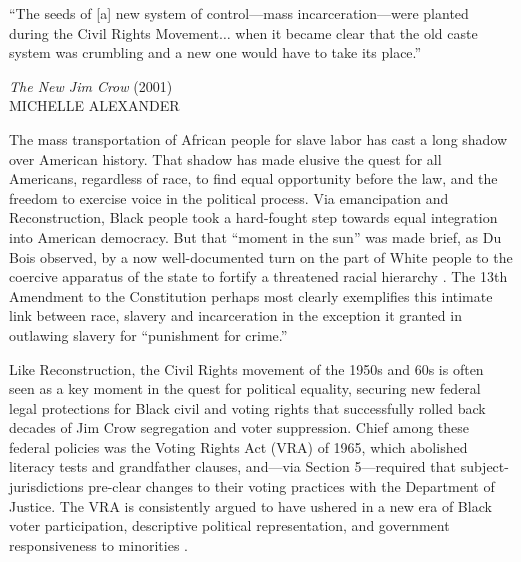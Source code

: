 \documentclass[12pt]{article}
\begin{document}
\newpage \clearpage





\singlespacing
\vspace{.2in}
\epigraph{``The seeds of [a] new system of control---mass incarceration---were planted during the Civil Rights Movement$\ldots$ when it became clear that the old caste system was crumbling and a new one would have to take its place.''}	{\footnotesize \textit{The New Jim Crow}  (2001)\\ \scriptsize MICHELLE ALEXANDER}

\vspace{.2in}

\onehalfspacing






The mass transportation of African people for slave labor has cast a long shadow over American history.  That shadow has made elusive the quest for all Americans, regardless of race, to find equal opportunity before the law, and the freedom to exercise voice in the political process.  Via emancipation and Reconstruction, Black people took a hard-fought step towards equal integration into American democracy.  But that ``moment in the sun'' was made brief, as Du Bois observed, by a now well-documented turn on the part of White people to the coercive apparatus of the state to fortify a threatened racial hierarchy  \citep{DuBois:1998vn,Lichtenstein:1996ug,Oshinsky:1997up,Blackmon:2009wo,Muhammad:2011wf,LeFlouria:2015vj}.  The 13th Amendment to the Constitution perhaps most clearly exemplifies this intimate link between race, slavery and incarceration in the exception it granted in outlawing slavery for ``punishment for crime.''

Like Reconstruction, the Civil Rights movement of the 1950s and 60s is often seen as a key moment in the quest for political equality, securing new federal legal protections for Black civil and voting rights that successfully rolled back decades of Jim Crow segregation and voter suppression.  Chief among these federal policies was the Voting Rights Act (VRA) of 1965, which abolished literacy tests and grandfather clauses, and---via Section 5---required that subject-jurisdictions pre-clear changes to their voting practices with the Department of Justice.  The VRA is consistently argued to have ushered in a new era of Black voter participation, descriptive political representation, and government responsiveness to minorities \citep{Davidson:1994ue,BullockIII:2009uu,Washington:2014tk,Fresh:2018td,Bernini:2017tv,Aneja:2019uz}.
\end{document}
